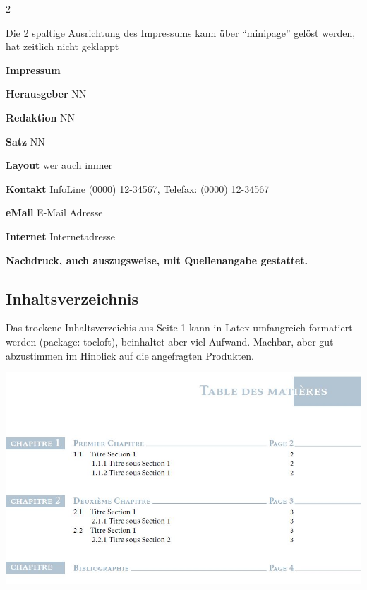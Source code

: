 \documentclass[
  a4paper,
  twoside]{article}
\begin{document}
\begin {multicols}{2}

\vspace*{\textheight}

\columnbreak

\vspace*{12cm}

Die 2 spaltige Ausrichtung des Impressums kann über ``minipage'' gelöst werden, hat zeitlich nicht geklappt

\textcolor{DoStat}{\textbf{Impressum}}

\textbf{Herausgeber} \hspace{0.5cm} NN

\textbf{Redaktion} \hspace{0.5cm} NN

\textbf{Satz} \hspace{0.5cm} NN

\textbf{Layout} \hspace{0.5cm} wer auch immer

\textbf{Kontakt} \hspace{0.5cm} InfoLine (0000) 12-34567, Telefax: (0000) 12-34567

\textbf{eMail} \hspace{0.5cm} E-Mail Adresse

\textbf{Internet} \hspace{0.5cm} Internetadresse

\textcolor{DoStat}{\textbf{Nachdruck, auch auszugsweise, mit Quellenangabe gestattet.}}

\end {multicols}

\newpage

\hypertarget{inhaltsverzeichnis}{%
\subsection{Inhaltsverzeichnis}\label{inhaltsverzeichnis}}

Das trockene Inhaltsverzeichis aus Seite 1 kann in Latex umfangreich formatiert werden (package: tocloft), beinhaltet aber viel Aufwand. Machbar, aber gut abzustimmen im Hinblick auf die angefragten Produkten.

\includegraphics{B8obV.jpg}
\end{document}
